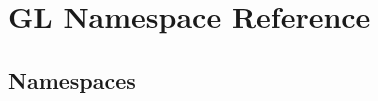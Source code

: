 \hypertarget{namespace_g_l}{}\section{GL Namespace Reference}
\label{namespace_g_l}
\subsection*{Namespaces}
\begin{DoxyCompactItemize}
\end{DoxyCompactItemize}
